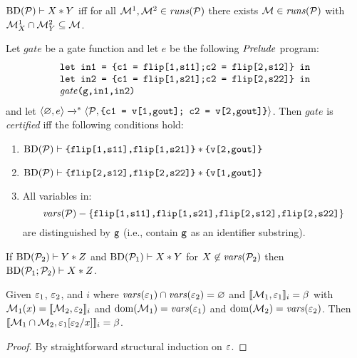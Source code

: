 \begin{lemma}
  \label{lemma-sepjoin}
  $\mathrm{BD}(\mathcal{P}) \vdash X * Y$ iff for all 
  $\mathcal{M}^1, \mathcal{M}^2 \in \mathit{runs}(\mathcal{P})$ there exists
  $\mathcal{M} \in \mathit{runs}(\mathcal{P})$ with
  $\mathcal{M}^1_{X} \cap \mathcal{M}^2_{Y} \subseteq \mathcal{M}$.
\end{lemma}


\begin{definition}
  \label{definition-gmwgate-certification}
  Let $\mathit{gate}$ be a gate function and let $e$ be the following
  $\mathit{Prelude}$ program:
  $$
  \begin{array}{l}
    \texttt{let in1 = \{c1 = flip[1,s11];c2 = flip[2,s12]\} in}\\
    \texttt{let in2 = \{c1 = flip[1,s21];c2 = flip[2,s22]\} in}\\
    \mathit{gate}\texttt{(g,in1,in2)}
  \end{array}
  $$
  and let $
  \langle \varnothing,e \rangle\xrightarrow{}^{*}\langle \mathcal{P},\texttt{\{c1 = v[1,gout]; c2 = v[2,gout]\}} \rangle
  $.
  Then $\mathit{gate}$ is \emph{certified} iff the following conditions hold:
  \begin{enumerate}[\hspace{5mm}i.]
  \item $\mathrm{BD}(\mathcal{P}) \vdash \texttt{\{flip[1,s11],flip[1,s21]\}} * \texttt{\{v[2,gout]\}}$
  \item $\mathrm{BD}(\mathcal{P}) \vdash \texttt{\{flip[2,s12],flip[2,s22]\}} * \texttt{\{v[1,gout]\}}$
  \item All variables in:$$\mathit{vars}(\mathcal{P}) - \{ \texttt{flip[1,s11],flip[1,s21],flip[2,s12],flip[2,s22]}\}$$
    are distinguished by $\texttt{g}$ (i.e., contain $\texttt{g}$ as an identifier substring). 
  \end{enumerate}
\end{definition}

\begin{lemma}
  \label{lemma-gmw-frame}
  If $\mathrm{BD}(\mathcal{P}_2) \vdash Y * Z$ and $\mathrm{BD}(\mathcal{P}_1) \vdash X * Y$ for
  $X \not\in \mathit{vars}(\mathcal{P}_2)$ then $\mathrm{BD}(\mathcal{P}_1;\mathcal{P}_2) \vdash X * Z$. 
\end{lemma}

\begin{lemma}
  \label{lemma-presub}
  Given $\varepsilon_1$, $\varepsilon_2$, and $i$ where $\mathit{vars}(\varepsilon_1) \cap
  \mathit{vars}(\varepsilon_2) = \varnothing$ and $\llbracket \mathcal{M}_1,\varepsilon_1 \rrbracket_{i} = \beta$
  with $\mathcal{M}_1(x) = \llbracket \mathcal{M}_2,\varepsilon_2 \rrbracket_{i}$ and
  $\mathrm{dom}(\mathcal{M}_1) = \mathit{vars}(\varepsilon_1)$ and $\mathrm{dom}(\mathcal{M}_2) = \mathit{vars}(\varepsilon_2)$.
  Then $\llbracket \mathcal{M}_1\cap\mathcal{M}_2,\varepsilon_1[\varepsilon_2/x] \rrbracket_{i} = \beta$.
\end{lemma}
\begin{proof}
By straightforward structural induction on $\varepsilon$.
\end{proof}

